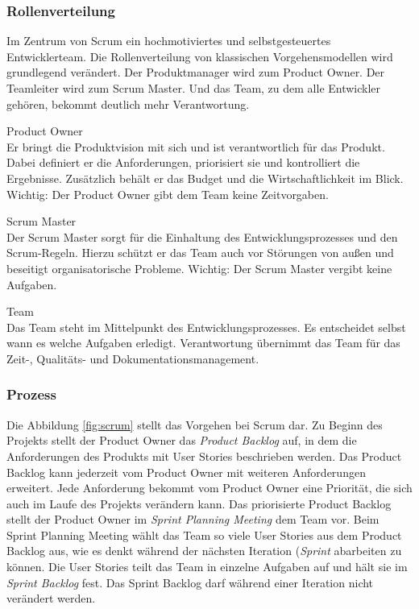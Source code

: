 \subsubsection{Rollenverteilung}
Im Zentrum von Scrum ein hochmotiviertes und selbstgesteuertes Entwicklerteam. Die Rollenverteilung von klassischen Vorgehensmodellen wird grundlegend verändert. Der Produktmanager wird zum Product Owner. Der Teamleiter wird zum Scrum Master. Und das Team, zu dem alle Entwickler gehören, bekommt deutlich mehr Verantwortung.

\begin{description}
\item Product Owner\\
Er bringt die Produktvision mit sich und ist verantwortlich für das Produkt. Dabei definiert er die Anforderungen, priorisiert sie und kontrolliert die Ergebnisse. Zusätzlich behält er das Budget und die Wirtschaftlichkeit im Blick. Wichtig: Der Product Owner gibt dem Team keine Zeitvorgaben.

\item Scrum Master\\
Der Scrum Master sorgt für die Einhaltung des Entwicklungsprozesses und den Scrum-Regeln. Hierzu schützt er das Team auch vor Störungen von außen und beseitigt organisatorische Probleme. Wichtig: Der Scrum Master vergibt keine Aufgaben.

\item Team\\
Das Team steht im Mittelpunkt des Entwicklungsprozesses. Es entscheidet selbst wann es welche Aufgaben erledigt. Verantwortung übernimmt das Team für das Zeit-, Qualitäts- und Dokumentationsmanagement.
\end{description}

\subsubsection{Prozess}
Die Abbildung \ref{fig:scrum} stellt das Vorgehen bei Scrum dar. Zu Beginn des Projekts stellt der Product Owner das \emph{Product Backlog} auf, in dem die Anforderungen des Produkts mit User Stories beschrieben werden. Das Product Backlog kann jederzeit vom Product Owner mit weiteren Anforderungen erweitert. Jede Anforderung bekommt vom Product Owner eine Priorität, die sich auch im Laufe des Projekts verändern kann. Das priorisierte Product Backlog stellt der Product Owner im \emph{Sprint Planning Meeting} dem Team vor. Beim Sprint Planning Meeting wählt das Team so viele User Stories aus dem Product Backlog aus, wie es denkt während der nächsten Iteration (\emph{Sprint} abarbeiten zu können. Die User Stories teilt das Team in einzelne Aufgaben auf und hält sie im \emph{Sprint Backlog} fest. Das Sprint Backlog darf während einer Iteration nicht verändert werden.

